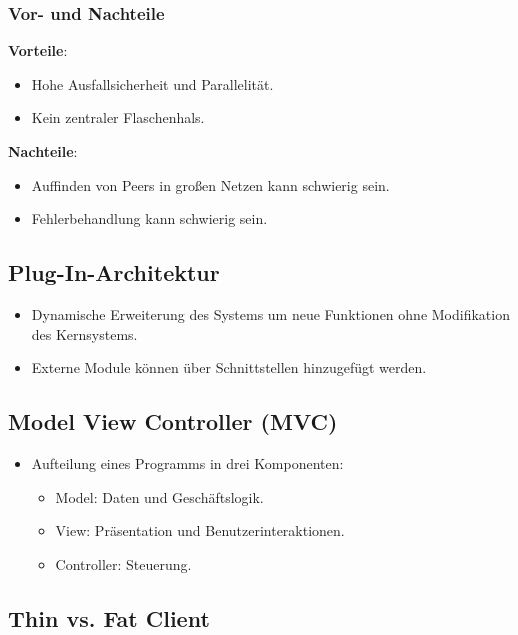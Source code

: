 \documentclass[11pt, a4paper]{article}
\begin{document}
\subsubsection{Vor- und Nachteile}
\textbf{Vorteile}:
\begin{itemize}
    \item Hohe Ausfallsicherheit und Parallelität.
    \item Kein zentraler Flaschenhals.
\end{itemize}

\textbf{Nachteile}:
\begin{itemize}
    \item Auffinden von Peers in großen Netzen kann schwierig sein.
    \item Fehlerbehandlung kann schwierig sein.
\end{itemize}



\subsection{Plug-In-Architektur}

\begin{itemize}
    \item Dynamische Erweiterung des Systems um neue Funktionen ohne Modifikation des Kernsystems.
    \item Externe Module können über Schnittstellen hinzugefügt werden.
\end{itemize}



\subsection{Model View Controller (MVC)}

\begin{itemize}
    \item Aufteilung eines Programms in drei Komponenten:
    \begin{itemize}
        \item Model: Daten und Geschäftslogik.
        \item View: Präsentation und Benutzerinteraktionen.
        \item Controller: Steuerung.
    \end{itemize}
\end{itemize}


\subsection{Thin vs. Fat Client}
\end{document}
